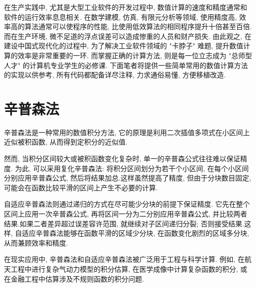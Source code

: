 \documentclass[a4paper]{ctexbook}
\begin{document}
在生产实践中, 尤其是大型工业软件的开发过程中, 数值计算的速度和精度通常和软件的运行效率息息相关. 在数学建模, 仿真, 有限元分析等领域, 使用精度高, 效率高的算法通常可以使程序的性能, 比使用低效算法的相同程序提升十倍甚至百倍. 而在生产环境, 微不足道的浮点误差可以造成惨重的人员和财产损失. 由此观之, 在建设中国式现代化的过程中, 为了解决工业软件领域的 "卡脖子" 难题, 提升数值计算的效率是非常重要的一环. 而掌握正确的计算方法, 则是每一位立志成为 "总师型人才" 的计算机专业学生的必修课. 下面笔者将提供一些简单常用的数值计算方法的实现以供参考, 所有代码都配备详尽注释, 力求通俗易懂, 方便移植改造.

\section{辛普森法}

辛普森法是一种常用的数值积分方法, 它的原理是利用二次插值多项式在小区间上近似被积函数, 从而得到定积分的近似值.

然而, 当积分区间较大或被积函数变化复杂时, 单一的辛普森公式往往难以保证精度. 为此, 可以采用复化辛普森法: 将积分区间划分为若干个小区间, 在每个小区间分别应用辛普森公式, 然后将结果加总.这样虽然提高了精度, 但由于分块数目固定, 可能会在函数比较平滑的区间上产生不必要的计算.

自适应辛普森法则通过递归的方式在尽可能少分块的前提下保证精度. 它先在整个区间上应用一次辛普森公式, 再将区间一分为二分别应用辛普森公式, 并比较两者结果.如果二者差异超过误差容许范围, 就继续对子区间递归分裂; 否则接受结果.这样, 自适应辛普森法能够在函数平滑的区域少分块, 在函数变化剧烈的区域多分块, 从而兼顾效率和精度.

在现实应用中, 辛普森法和自适应辛普森法被广泛用于工程与科学计算. 例如, 在航天工程中进行复杂气动力模型的积分估算, 在医学成像中计算复杂函数的积分, 或在金融工程中估算涉及不规则函数的积分问题.


\end{document}
